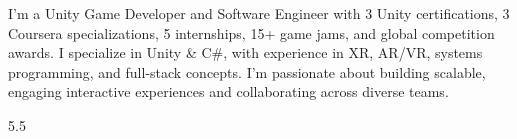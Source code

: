 \documentclass[9pt]{developercv}
\begin{document}
	\begin{minipage}[t]{0.4\textwidth}
		\vspace{-\baselineskip}
		I’m a Unity Game Developer and Software Engineer with 3 Unity certifications, 3 Coursera specializations, 5 internships, 15+ game jams, and global competition awards. I specialize in Unity \& C\#, with experience in XR, AR/VR, systems programming, and full-stack concepts. I’m passionate about building scalable, engaging interactive experiences and collaborating across diverse teams.\\
	\end{minipage}
	\hfill
	\begin{minipage}[t]{0.5\textwidth}
		\vspace{-\baselineskip}
		
		\begin{barchart}{5.5}
		\end{barchart}
	\end{minipage}
	
	
	
\end{document}
